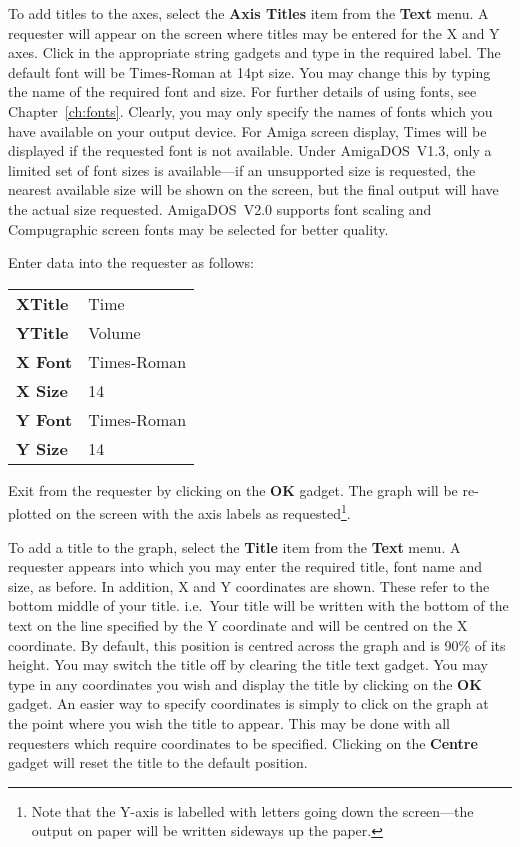 To add titles to the axes, select the {\bf Axis Titles}
item from the {\bf Text} menu. 
A requester will appear on the screen where titles may be entered for the X and Y 
axes. Click in the appropriate string gadgets and type in the required label. The 
default font will be Times-Roman at 14pt size.
You may change this by typing the name of the required font and size. 
For further details of using fonts, see Chapter~\ref{ch:fonts}.
Clearly, you may only specify the names of fonts
which you have available on your output device.
For Amiga screen display, Times will be displayed if the requested font is not 
available. Under AmigaDOS~V1.3, only a limited set of font sizes is available---if 
an unsupported size is requested, the nearest available size will be shown on the 
screen, but the final output will have the actual size requested. AmigaDOS~V2.0 
supports font scaling and Compugraphic screen fonts may be selected for better 
quality.

Enter data into the requester as follows:

\begin{tabular}{ll}
{\bf XTitle}  & Time          \\
{\bf YTitle}  & Volume        \\
{\bf X Font}  & Times-Roman   \\
{\bf X Size}  & 14            \\
{\bf Y Font}  & Times-Roman   \\
{\bf Y Size}  & 14            \\
\end{tabular}

\noindent Exit from the requester by clicking on the {\bf OK} gadget. The graph 
will be 
re-plotted on the screen with the axis labels as requested\footnote{Note that the
Y-axis is labelled with letters going down the screen---the output on paper will be 
written sideways up the paper.}.

To add a title to the graph, 
select the {\bf Title} item from the {\bf Text} menu.
A requester appears into which you may enter the required title, font name and 
size, as before. In addition, X and Y coordinates are shown. These refer to the 
bottom middle of your title. i.e.\ Your title will be written with the bottom of 
the text on the line specified by the Y coordinate and will be centred on the X 
coordinate. By default, this position is centred across the graph and is 90\% of 
its height. You may switch the title off by clearing the title text gadget. You 
may type in any coordinates you wish and display the title by clicking on the {\bf 
OK}
gadget. An easier way to specify coordinates is simply to click on the graph at the
point where you wish the title to appear. This may be done with all requesters which 
require coordinates to be specified.
Clicking on the {\bf Centre} gadget will reset the title to the default position.

